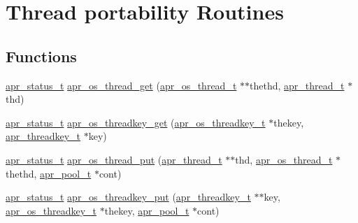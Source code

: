 \hypertarget{group__apr__os__thread}{\section{Thread portability Routines}
\label{group__apr__os__thread}
}
\subsection*{Functions}
\begin{DoxyCompactItemize}
\item 
\hyperlink{group__apr__errno_gaf76ee4543247e9fb3f3546203e590a6c}{apr\-\_\-status\-\_\-t} \hyperlink{group__apr__os__thread_gadda5e99fc387491a2a9436bf6144bd49}{apr\-\_\-os\-\_\-thread\-\_\-get} (\hyperlink{group__apr__portabile_ga4ccd9519af148ccf9cff850dd58f00b6}{apr\-\_\-os\-\_\-thread\-\_\-t} $\ast$$\ast$thethd, \hyperlink{group__apr__thread__proc_ga646c71351e723d84f8cc8c8d1d5937be}{apr\-\_\-thread\-\_\-t} $\ast$thd)
\item 
\hyperlink{group__apr__errno_gaf76ee4543247e9fb3f3546203e590a6c}{apr\-\_\-status\-\_\-t} \hyperlink{group__apr__os__thread_ga2fd6ec9d398c4f2564765866c3d31219}{apr\-\_\-os\-\_\-threadkey\-\_\-get} (\hyperlink{group__apr__portabile_ga0a228496d8a1a9b3be744ddb101a3e76}{apr\-\_\-os\-\_\-threadkey\-\_\-t} $\ast$thekey, \hyperlink{group__apr__thread__proc_ga337c9c1bd2d47740022071a5c41f2edb}{apr\-\_\-threadkey\-\_\-t} $\ast$key)
\item 
\hyperlink{group__apr__errno_gaf76ee4543247e9fb3f3546203e590a6c}{apr\-\_\-status\-\_\-t} \hyperlink{group__apr__os__thread_ga7eda58df34fbc11cd251899e575a1b0f}{apr\-\_\-os\-\_\-thread\-\_\-put} (\hyperlink{group__apr__thread__proc_ga646c71351e723d84f8cc8c8d1d5937be}{apr\-\_\-thread\-\_\-t} $\ast$$\ast$thd, \hyperlink{group__apr__portabile_ga4ccd9519af148ccf9cff850dd58f00b6}{apr\-\_\-os\-\_\-thread\-\_\-t} $\ast$thethd, \hyperlink{group__apr__pools_gaf137f28edcf9a086cd6bc36c20d7cdfb}{apr\-\_\-pool\-\_\-t} $\ast$cont)
\item 
\hyperlink{group__apr__errno_gaf76ee4543247e9fb3f3546203e590a6c}{apr\-\_\-status\-\_\-t} \hyperlink{group__apr__os__thread_ga386f6e3e205d422f623132bb50147133}{apr\-\_\-os\-\_\-threadkey\-\_\-put} (\hyperlink{group__apr__thread__proc_ga337c9c1bd2d47740022071a5c41f2edb}{apr\-\_\-threadkey\-\_\-t} $\ast$$\ast$key, \hyperlink{group__apr__portabile_ga0a228496d8a1a9b3be744ddb101a3e76}{apr\-\_\-os\-\_\-threadkey\-\_\-t} $\ast$thekey, \hyperlink{group__apr__pools_gaf137f28edcf9a086cd6bc36c20d7cdfb}{apr\-\_\-pool\-\_\-t} $\ast$cont)
$$
\end{DoxyCompactItemize}
